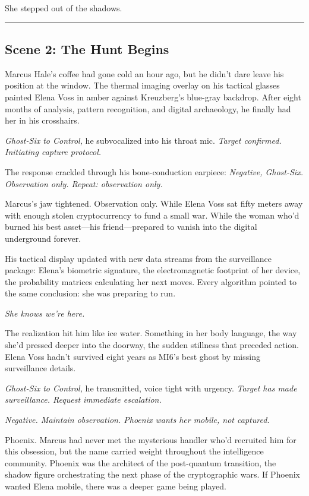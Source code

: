 \documentclass[12pt,letterpaper]{book}
\begin{document}
She stepped out of the shadows.

\begin{center}\rule{0.5\linewidth}{0.5pt}\end{center}

\hypertarget{scene-2-the-hunt-begins}{%
\subsection{Scene 2: The Hunt Begins}\label{scene-2-the-hunt-begins}}

Marcus Hale's coffee had gone cold an hour ago, but he didn't dare leave his position at the window. The thermal imaging overlay on his tactical glasses painted Elena Voss in amber against Kreuzberg's blue-gray backdrop. After eight months of analysis, pattern recognition, and digital archaeology, he finally had her in his crosshairs.

\emph{Ghost-Six to Control,} he subvocalized into his throat mic. \emph{Target confirmed. Initiating capture protocol.}

The response crackled through his bone-conduction earpiece: \emph{Negative, Ghost-Six. Observation only. Repeat: observation only.}

Marcus's jaw tightened. Observation only. While Elena Voss sat fifty meters away with enough stolen cryptocurrency to fund a small war. While the woman who'd burned his best asset---his friend---prepared to vanish into the digital underground forever.

His tactical display updated with new data streams from the surveillance package: Elena's biometric signature, the electromagnetic footprint of her device, the probability matrices calculating her next moves. Every algorithm pointed to the same conclusion: she was preparing to run.

\emph{She knows we're here.}

The realization hit him like ice water. Something in her body language, the way she'd pressed deeper into the doorway, the sudden stillness that preceded action. Elena Voss hadn't survived eight years as MI6's best ghost by missing surveillance details.

\emph{Ghost-Six to Control,} he transmitted, voice tight with urgency. \emph{Target has made surveillance. Request immediate escalation.}

\emph{Negative. Maintain observation. Phoenix wants her mobile, not captured.}

Phoenix. Marcus had never met the mysterious handler who'd recruited him for this obsession, but the name carried weight throughout the intelligence community. Phoenix was the architect of the post-quantum transition, the shadow figure orchestrating the next phase of the cryptographic wars. If Phoenix wanted Elena mobile, there was a deeper game being played.
\end{document}

